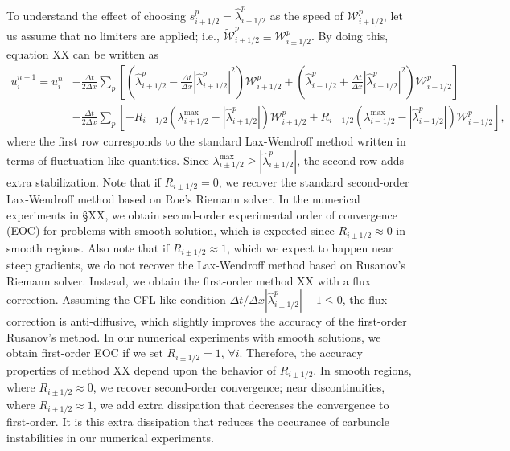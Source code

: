 \documentclass[preprint, 11pt]{article}
\newcommand{\W}{{\mathcal W}}
\begin{document}
To understand the effect of choosing $s_{i+1/2}^p=\hat\lambda_{i+1/2}^p$ as the speed of $\W_{i+1/2}^p$, 
let us assume that no limiters are applied; i.e., $\tilde\W_{i\pm 1/2}^p\equiv \W_{i\pm 1/2}^p$.
By doing this, equation XX can be written as 
\begin{align*}
  u_i^{n+1}=u_i^n
  &-\frac{\Delta t}{2 \Delta x}
  \sum_p
  \left[\left(\hat\lambda_{i+1/2}^p -\frac{\Delta t}{\Delta x}|\hat\lambda_{i+1/2}^p|^2 \right)\W_{i+1/2}^p
  +
  \left(\hat\lambda_{i-1/2}^p +\frac{\Delta t}{\Delta x}|\hat\lambda_{i-1/2}^p|^2 \right)\W_{i-1/2}^p\right] \\
  &-\frac{\Delta t}{2\Delta x}
  \sum_p 
  \left[-R_{i+1/2}\left(\lambda_{i+1/2}^{\max}-|\hat\lambda_{i+1/2}^p|\right)\W_{i+1/2}^p
    +R_{i-1/2}\left(\lambda_{i-1/2}^{\max}-|\hat\lambda_{i-1/2}^p|\right)\W_{i-1/2}^p\right],
\end{align*}
where the first row corresponds to the standard Lax-Wendroff method written in terms of 
fluctuation-like quantities. 
Since $\lambda_{i\pm1/2}^{\max}\geq |\hat\lambda_{i\pm1/2}^p|$, 
the second row adds extra stabilization.
Note that if $R_{i\pm 1/2}=0$, we recover the standard second-order Lax-Wendroff method based on 
Roe's Riemann solver. 
In the numerical experiments in \S XX, we obtain second-order experimental 
order of convergence (EOC) for problems with smooth solution, which is expected since 
$R_{i\pm 1/2}\approx 0$ in smooth regions.
Also note that if $R_{i\pm 1/2}\approx 1$, which we expect to happen near steep gradients, 
we do not recover the Lax-Wendroff method based on Rusanov's Riemann solver. 
Instead, we obtain the first-order method XX with a flux correction. Assuming 
the CFL-like condition $\Delta t/\Delta x|\hat\lambda_{i\pm1/2}^p|-1\leq 0$, the flux correction is anti-diffusive, 
which slightly improves the accuracy of the first-order Rusanov's method. 
In our numerical experiments 
with smooth solutions, we obtain first-order EOC if we set $R_{i\pm1/2}=1$, $\forall i$. 
%
Therefore, the accuracy properties of method XX depend upon the behavior of $R_{i\pm 1/2}$. 
In smooth regions, where $R_{i\pm 1/2}\approx 0$, we recover second-order convergence;
near discontinuities, where $R_{i\pm 1/2}\approx 1$, we add extra dissipation that decreases the convergence 
to first-order. It is this extra dissipation that reduces the occurance of carbuncle instabilities 
in our numerical experiments.
\end{document}
